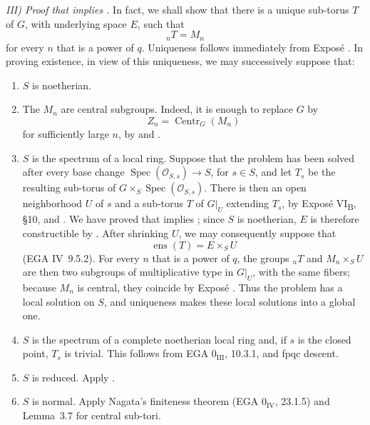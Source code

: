 \medskip
\noindent\textit{III) Proof that \textup{} implies
\textup{}.}\quad
In fact, we shall show that there is a unique sub-torus \(T\) of
\(G\), with underlying space \(E\), such that
\[
  {}_nT=M_n
\]
for every \(n\) that is a power of \(q\). Uniqueness follows
immediately from Exposé . In proving existence, in view of
this uniqueness, we may successively suppose that:
\begin{enumerate}
\item[\normalfont a)] \(S\) is noetherian.
\item[\normalfont b)] The \(M_n\) are central subgroups. Indeed, it
is enough to replace \(G\) by
\[
  Z_n=\operatorname{Centr}_G(M_n)
\]
for sufficiently large \(n\), by  and .
\item[\normalfont c)] \(S\) is the spectrum of a local ring.
Suppose that the problem has been solved after every base change
\(\operatorname{Spec}(\mathcal O_{S,s})\to S\), for \(s\in S\),
and let \(T_s\) be the resulting sub-torus of
\(G\times_S\operatorname{Spec}(\mathcal O_{S,s})\). There is then
an open neighborhood \(U\) of \(s\) and a sub-torus \(T\) of
\(G|_U\) extending \(T_s\), by Exposé VI\textsubscript{B}, \S10,
and . We have proved that  implies ; since \(S\)
is noetherian, \(E\) is therefore constructible by . After
shrinking \(U\), we may consequently suppose that
\[
  \operatorname{ens}(T)=E\times_S U
\]
(EGA IV~9.5.2). For every \(n\) that is a power of \(q\), the
groups \({}_nT\) and \(M_n\times_S U\) are then two subgroups of
multiplicative type in \(G|_U\), with the same fibers; because
\(M_n\) is central, they coincide by Exposé . Thus the
problem has a local solution on \(S\), and uniqueness makes these
local solutions into a global one.
\item[\normalfont d)] \(S\) is the spectrum of a complete
noetherian local ring and, if \(s\) is the closed point, \(T_s\)
is trivial. This follows from EGA \(0_{\mathrm{III}}\), 10.3.1,
and fpqc descent.
\item[\normalfont e)] \(S\) is reduced. Apply .
\item[\normalfont f)] \(S\) is normal. Apply Nagata's finiteness
theorem (EGA \(0_{\mathrm{IV}}\), 23.1.5) and Lemma~3.7 for
central sub-tori.
\end{enumerate}

